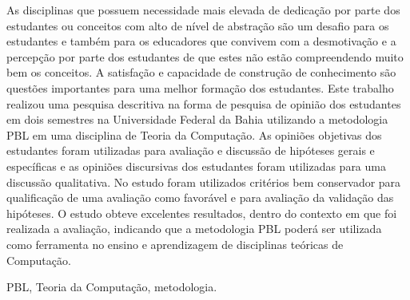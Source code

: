 \resumo

As disciplinas que possuem necessidade mais elevada de dedicação
por parte dos estudantes ou conceitos com alto de nível de abstração
são um desafio para os estudantes e também para os educadores
que convivem com a desmotivação e a percepção por parte dos
estudantes de que estes não estão compreendendo muito
bem os conceitos.
A satisfação e capacidade de construção de conhecimento
são questões importantes para uma melhor formação dos estudantes.
Este trabalho realizou uma pesquisa descritiva na forma
de pesquisa de opinião dos estudantes em dois semestres
na Universidade Federal da Bahia utilizando a
metodologia PBL em uma disciplina de Teoria da
Computação.
As opiniões objetivas dos estudantes foram utilizadas para
avaliação e discussão de hipóteses gerais e específicas e
as opiniões discursivas dos estudantes foram utilizadas para
uma discussão qualitativa.
No estudo foram utilizados critérios bem
conservador para qualificação de uma avaliação
como favorável e para avaliação da validação das
hipóteses.
O estudo obteve excelentes resultados, dentro do contexto
em que foi realizada a avaliação, indicando que a
metodologia PBL poderá ser utilizada como ferramenta
no ensino e aprendizagem de disciplinas teóricas
de Computação.

\begin{keywords}
PBL, Teoria da Computação, metodologia.
\end{keywords}

